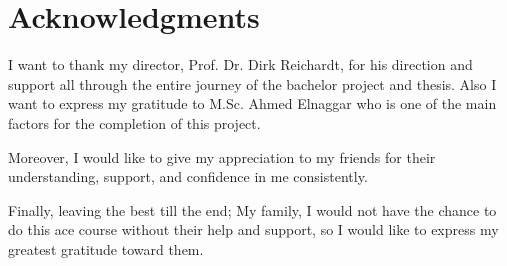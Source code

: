 \chapter*{Acknowledgments}
\label{chap:ack}
I want to thank my director, Prof. Dr. Dirk Reichardt, for his direction and support all through the entire journey of the bachelor project and thesis. Also I want to express my gratitude to M.Sc. Ahmed Elnaggar who is one of the main factors for the completion of this project.  

Moreover, I would like to give my appreciation to my friends for their understanding, support, and confidence in me consistently. 

Finally, leaving the best till the end; My family, I would not have the chance to do this ace course without their help and support, so I would like to express my greatest gratitude toward them.
